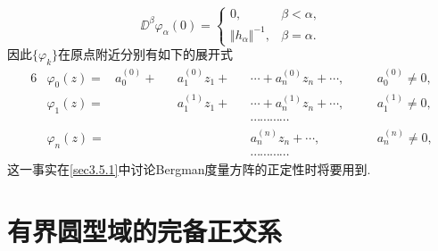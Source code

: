 \[\DD^\beta \varphi_\alpha(0)=\begin{cases}
	0, &\beta<\alpha,\\
	\Vert h_\alpha\Vert^{-1}, &\beta=\alpha.
\end{cases}\]
因此$\{\varphi_k\}$在原点附近分别有如下的展开式
\begin{alignat*}{6}
	&\varphi_0(z)
	=&a_0^{(0)}+&&a_1^{(0)}z_1+&&\cdots+a_n^{(0)}z_n+\cdots,\quad &&a_0^{(0)}\neq0,\\
	&\varphi_1(z)
	=&  &&a_1^{(1)}z_1+&&\cdots+a_n^{(1)}z_n+\cdots,\quad &&a_1^{(1)}\neq0,\\
	& & && && \cdots\cdots\cdots\cdots  &&\\
	&\varphi_n(z)
	=& && &&a_n^{(n)}z_n+\cdots,\quad &&a_n^{(n)}\neq0,\\
	& & && && \cdots\cdots\cdots\cdots  &&
\end{alignat*}
这一事实在\ref{sec3.5.1}中讨论Bergman度量方阵的正定性时将要用到.
\section{有界圆型域的完备正交系\label{sec3.2}}
